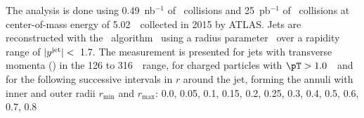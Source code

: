 The analysis is done using 0.49~nb$^{-1}$ of \pbpb\ collisions and 
25~pb$^{-1}$ of \pp\ collisions at center-of-mass energy of 5.02~\TeV\ collected in 2015 by ATLAS.
Jets are reconstructed with the \antikt\ algorithm~\cite{Cacciari:2008qp} using a radius parameter \RFour\ over a rapidity range of $|\mbox{$y^{\mathrm{jet}}$}| <$~1.7. The measurement is presented for jets with transverse momenta (\ptjet) in the 126 to 316~\GeV\ range, for charged particles with $\pT>1.0$~\GeV\ and for the following successive intervals in $r$ around the jet, forming the annuli with inner and outer radii $r_{\textrm{min}}$ and $r_{\textrm{max}}$: 0.0, 0.05, 0.1, 0.15, 0.2, 0.25, 0.3, 0.4, 0.5, 0.6, 0.7, 0.8

